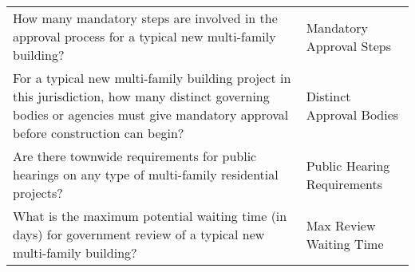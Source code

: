 \begin{tabular}{p{16cm}p{6cm}}
How many mandatory steps are involved in the approval process for a typical new multi-family building? & Mandatory Approval Steps \\
For a typical new multi-family building project in this jurisdiction, how many distinct governing bodies or agencies must give mandatory approval before construction can begin? & Distinct Approval Bodies \\
Are there townwide requirements for public hearings on any type of multi-family residential projects? & Public Hearing Requirements \\
What is the maximum potential waiting time (in days) for government review of a typical new multi-family building? & Max Review Waiting Time \\
\bottomrule
\end{tabular}
